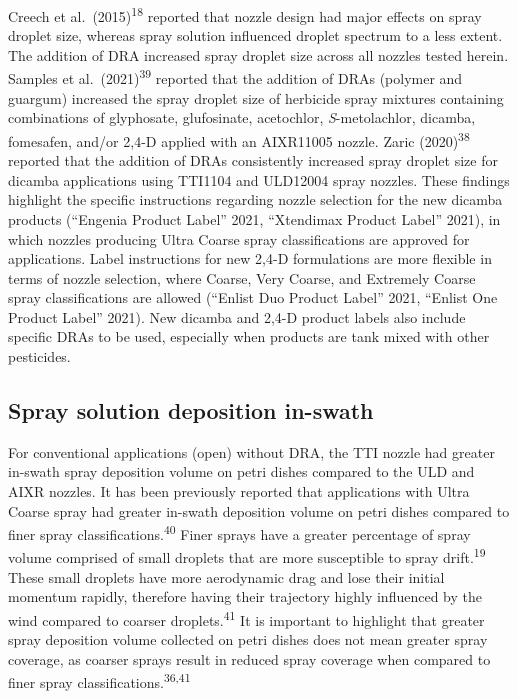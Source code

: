 \documentclass[
  12pt,
  a4paper,
]{article}
\begin{document}
Creech et al.~(2015)\textsuperscript{18} reported that nozzle design had
major effects on spray droplet size, whereas spray solution influenced
droplet spectrum to a less extent. The addition of DRA increased spray
droplet size across all nozzles tested herein. Samples et
al.~(2021)\textsuperscript{39} reported that the addition of DRAs
(polymer and guargum) increased the spray droplet size of herbicide
spray mixtures containing combinations of glyphosate, glufosinate,
acetochlor, \emph{S}-metolachlor, dicamba, fomesafen, and/or 2,4-D
applied with an AIXR11005 nozzle. Zaric (2020)\textsuperscript{38}
reported that the addition of DRAs consistently increased spray droplet
size for dicamba applications using TTI1104 and ULD12004 spray nozzles.
These findings highlight the specific instructions regarding nozzle
selection for the new dicamba products (``Engenia Product Label'' 2021,
``Xtendimax Product Label'' 2021), in which nozzles producing Ultra
Coarse spray classifications are approved for applications. Label
instructions for new 2,4-D formulations are more flexible in terms of
nozzle selection, where Coarse, Very Coarse, and Extremely Coarse spray
classifications are allowed (``Enlist Duo Product Label'' 2021, ``Enlist
One Product Label'' 2021). New dicamba and 2,4-D product labels also
include specific DRAs to be used, especially when products are tank
mixed with other pesticides.

\hypertarget{spray-solution-deposition-in-swath}{%
\subsection{Spray solution deposition
in-swath}\label{spray-solution-deposition-in-swath}}

For conventional applications (open) without DRA, the TTI nozzle had
greater in-swath spray deposition volume on petri dishes compared to the
ULD and AIXR nozzles. It has been previously reported that applications
with Ultra Coarse spray had greater in-swath deposition volume on petri
dishes compared to finer spray classifications.\textsuperscript{40}
Finer sprays have a greater percentage of spray volume comprised of
small droplets that are more susceptible to spray
drift.\textsuperscript{19} These small droplets have more aerodynamic
drag and lose their initial momentum rapidly, therefore having their
trajectory highly influenced by the wind compared to coarser
droplets.\textsuperscript{41} It is important to highlight that greater
spray deposition volume collected on petri dishes does not mean greater
spray coverage, as coarser sprays result in reduced spray coverage when
compared to finer spray classifications.\textsuperscript{36,41}
\end{document}
